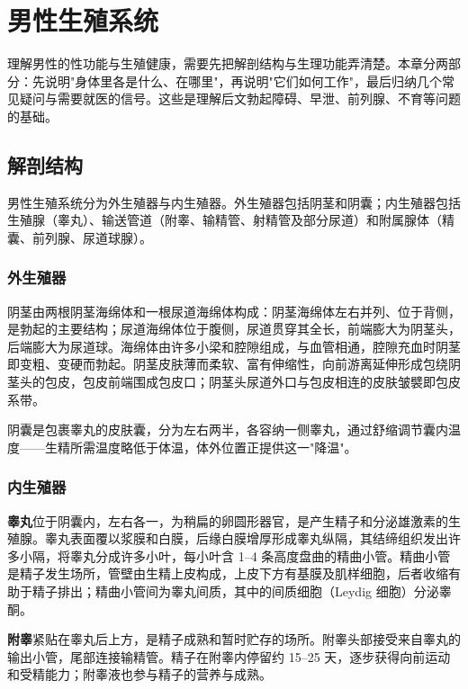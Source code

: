 \documentclass[12pt,UTF8,openany]{ctexbook}
\begin{document}
\chapter{男性生殖系统}
\label{chap:anatomy}

理解男性的性功能与生殖健康，需要先把解剖结构与生理功能弄清楚。本章分两部分：先说明"身体里各是什么、在哪里"，再说明"它们如何工作"，最后归纳几个常见疑问与需要就医的信号。这些是理解后文勃起障碍、早泄、前列腺、不育等问题的基础。

\section{解剖结构}

男性生殖系统分为外生殖器与内生殖器。外生殖器包括阴茎和阴囊；内生殖器包括生殖腺（睾丸）、输送管道（附睾、输精管、射精管及部分尿道）和附属腺体（精囊、前列腺、尿道球腺）。

\subsection*{外生殖器}

阴茎由两根阴茎海绵体和一根尿道海绵体构成：阴茎海绵体左右并列、位于背侧，是勃起的主要结构；尿道海绵体位于腹侧，尿道贯穿其全长，前端膨大为阴茎头，后端膨大为尿道球。海绵体由许多小梁和腔隙组成，与血管相通，腔隙充血时阴茎即变粗、变硬而勃起。阴茎皮肤薄而柔软、富有伸缩性，向前游离延伸形成包绕阴茎头的包皮，包皮前端围成包皮口；阴茎头尿道外口与包皮相连的皮肤皱襞即包皮系带。

阴囊是包裹睾丸的皮肤囊，分为左右两半，各容纳一侧睾丸，通过舒缩调节囊内温度——生精所需温度略低于体温，体外位置正提供这一"降温"。

\subsection*{内生殖器}

\textbf{睾丸}位于阴囊内，左右各一，为稍扁的卵圆形器官，是产生精子和分泌雄激素的生殖腺。睾丸表面覆以浆膜和白膜，后缘白膜增厚形成睾丸纵隔，其结缔组织发出许多小隔，将睾丸分成许多小叶，每小叶含 1--4 条高度盘曲的精曲小管。精曲小管是精子发生场所，管壁由生精上皮构成，上皮下方有基膜及肌样细胞，后者收缩有助于精子排出；精曲小管间为睾丸间质，其中的间质细胞（Leydig 细胞）分泌睾酮。

\textbf{附睾}紧贴在睾丸后上方，是精子成熟和暂时贮存的场所。附睾头部接受来自睾丸的输出小管，尾部连接输精管。精子在附睾内停留约 15--25 天，逐步获得向前运动和受精能力；附睾液也参与精子的营养与成熟。
\end{document}
